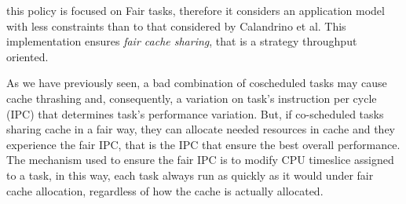 \begin{description}
this policy is focused on Fair tasks, therefore it considers an application model with less constraints than to that considered by
Calandrino et al. This implementation ensures \textit{fair cache sharing}, that is a strategy throughput oriented.

As we have previously seen, a bad combination of coscheduled tasks may cause cache thrashing and, consequently, a variation on task's instruction per cycle
(IPC) that determines task's performance variation. But, if co-scheduled tasks sharing cache in a fair way, they can allocate needed resources in cache and
they experience the fair IPC, that is the IPC that ensure the best overall performance. The mechanism used to ensure the fair IPC is to modify CPU timeslice 
assigned to a task, in this way, each task always run as quickly as it would under fair cache allocation, regardless of how the cache is actually allocated.


\end{description}
